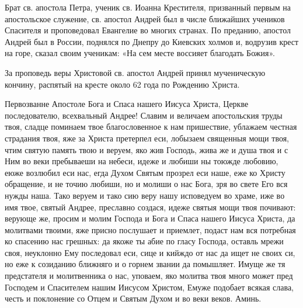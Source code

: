 \mychapterending


\begin{mymulticols}


{\small Брат св. апостола Петра, ученик св. Иоанна Крестителя, призванный первым на апостольское служение, св. апостол Андрей был в числе ближайших учеников Спасителя и проповедовал Евангелие во многих странах. По преданию, апостол Андрей был в России, поднялся по Днепру до Киевских холмов и, водрузив крест на горе, сказал своим ученикам: «На сем месте воссияет благодать Божия».

За проповедь веры Христовой св. апостол Андрей принял мученическую кончину, распятый на кресте около 62 года по Рождению Xриста.}


\vspace{-\baselineskip}

Первозванне Апостоле Бога и Спаса нашего Иисуса Христа, Церкве последователю, всехвальный Андрее! Славим и величаем апостольския труды твоя, сладце поминаем твое благословенное к нам пришествие, ублажаем честная страдания твоя, яже за Христа претерпел еси, лобызаем священныя мощи твоя, чтим святую память твою и веруем, яко жив Господь, жива же и душа твоя и с Ним во веки пребываеши на небеси, идеже и любиши ны тоюжде любовию, еюже возлюбил еси нас, егда Духом Святым прозрел еси наше, еже ко Христу обращение, и не точию любиши, но и молиши о нас Бога, зря во свете Его вся нужды наша. Тако веруем и тако сию веру нашу исповедуем во храме, иже во имя твое, святый Андрее, преславно создася, идеже святыя мощи твоя почивают: верующе же, просим и молим Господа и Бога и Спаса нашего Иисуса Христа, да молитвами твоими, яже присно послушает и приемлет, подаст нам вся потребная ко спасению нас грешных: да якоже ты абие по гласу Господа, оставль мрежи своя, неуклонно Ему последовал еси, сице и кийждо от нас да ищет не своих си, но еже к созиданию ближняго и о горнем звании да помышляет. Имуще же тя предстателя и молитвенника о нас, уповаем, яко молитва твоя много может пред Господем и Спасителем нашим Иисусом Христом, Емуже подобает всякая слава, честь и поклонение со Отцем и Святым Духом и во веки веков. Аминь.

\end{mymulticols}

\mychapterending


